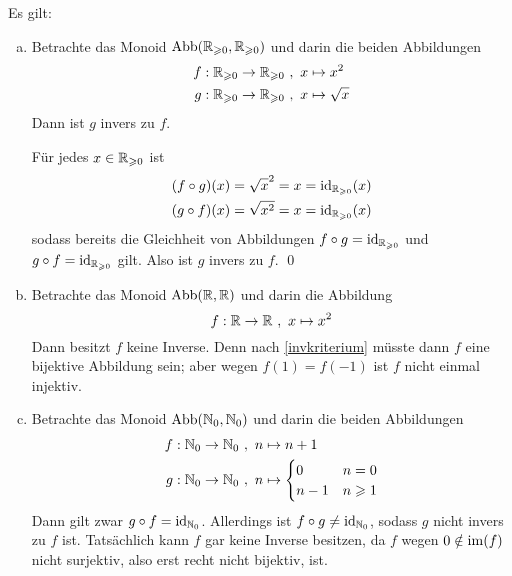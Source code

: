 \begin{bsp}
Es gilt:
\begin{enumerate}[a)]
 \item Betrachte das Monoid $\text{Abb}({\mathbb R}_{\geqslant 0},{\mathbb R}_{\geqslant 0})$ und darin die beiden Abbildungen
 \begin{align*}
  f : {\mathbb R}_{\geqslant 0}\to {\mathbb R}_{\geqslant 0} \ &,\ x\mapsto x^2 \\
  g: {\mathbb R}_{\geqslant 0}\to {\mathbb R}_{\geqslant 0} \ &,\ x\mapsto \sqrt{x}
 \end{align*}
Dann ist $g$ invers zu $f$.
\begin{bew}
 Für jedes $x\in {\mathbb R}_{\geqslant 0}$ ist
 \begin{align*}
  (f\circ g)(x) & = \sqrt{x}^2 =x = \operatorname{id}_{{\mathbb R}_{\geqslant 0}}(x) \\
  (g\circ f)(x) & = \sqrt{x^2} = x = \operatorname{id}_{{\mathbb R}_{\geqslant 0}}(x)
 \end{align*}
sodass bereits die Gleichheit von Abbildungen $f\circ g=\operatorname{id}_{{\mathbb R}_{\geqslant 0}}$ und $g\circ f=\operatorname{id}_{{\mathbb R}_{\geqslant 0}}$ gilt. Also ist $g$ invers zu $f$. \qed
\end{bew}
\item Betrachte das Monoid $\text{Abb}({\mathbb R},{\mathbb R})$ und darin die Abbildung
\[ f : {\mathbb R}\to {\mathbb R} \ ,\ x\mapsto x^2 \]
Dann besitzt $f$ keine Inverse. Denn nach \cref{invkriterium} müsste dann $f$ eine bijektive Abbildung sein; aber wegen $f(1)=f(-1)$ ist $f$ nicht einmal injektiv.
\item Betrachte das Monoid $\text{Abb}({\mathbb N}_0,{\mathbb N}_0)$ und darin die beiden Abbildungen
 \begin{align*}
  f : {\mathbb N}_0 \to {\mathbb N}_0 \ &,\ n \mapsto n+1 \\
  g: {\mathbb N}_0 \to {\mathbb N}_0 \ &,\ n\mapsto \begin{cases}
                                     0 & n=0 \\
                                     n-1 & n\geqslant 1
                                    \end{cases}
 \end{align*}
Dann gilt zwar $g\circ f=\operatorname{id}_{{\mathbb N}_0}$. Allerdings ist $f\circ g\neq \operatorname{id}_{{\mathbb N}_0}$, sodass $g$ nicht invers zu $f$ ist. Tatsächlich kann $f$ gar keine Inverse besitzen, da $f$ wegen $0\notin \operatorname{im}(f)$ nicht surjektiv, also erst recht nicht bijektiv, ist.
\end{enumerate}
\end{bsp}




